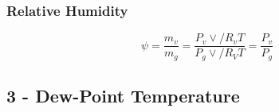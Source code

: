 \documentclass[10pt,landscape]{article}
\begin{document}
\begin{multicols}{3}
\subsubsection{Relative Humidity}
\begin{equation}
    \psi=\frac{m_v}{m_g}=\frac{P_v\vee/R_vT}{P_g\vee/R_VT}=\frac{P_v}{P_g}
\end{equation}
\subsection{3 - Dew-Point Temperature}




%
%

\end{multicols}
\end{document}
